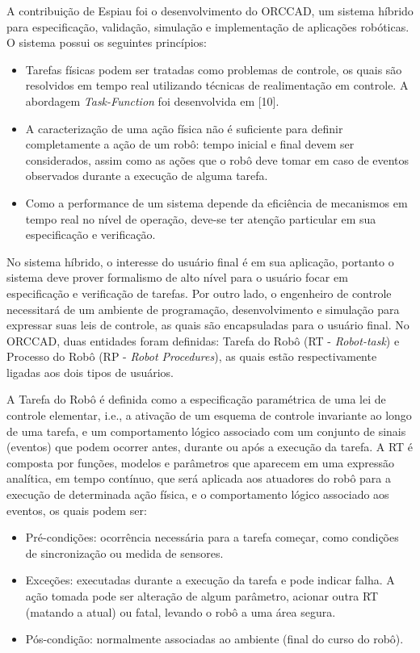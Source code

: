 A contribuição de Espiau foi o desenvolvimento do ORCCAD, um sistema híbrido
para especificação, validação, simulação e implementação de aplicações
robóticas. O sistema possui os seguintes princípios:

\begin{itemize}
  \item Tarefas físicas podem ser tratadas como problemas de controle, os quais
  são resolvidos em tempo real utilizando técnicas de realimentação em controle.
  A abordagem \emph{Task-Function} foi desenvolvida em [10].
  \item A caracterização de uma ação física não é suficiente para definir
  completamente a ação de um robô: tempo inicial e final devem ser considerados,
  assim como as ações que o robô deve tomar em caso de eventos observados
  durante a execução de alguma tarefa.
  \item Como a performance de um sistema depende da eficiência de mecanismos em
  tempo real no nível de operação, deve-se ter atenção particular em sua
  especificação e verificação.
\end{itemize}

No sistema híbrido, o interesse do usuário final é em sua aplicação, portanto
o sistema deve prover formalismo de alto nível para o usuário focar em
especificação e verificação de tarefas. Por outro lado, o engenheiro
de controle necessitará de um ambiente de programação, desenvolvimento e
simulação para expressar suas leis de controle, as quais são encapsuladas para
o usuário final. No ORCCAD, duas entidades foram definidas: Tarefa do Robô (RT
- \emph{Robot-task}) e Processo do Robô (RP - \emph{Robot Procedures}), as
quais estão respectivamente ligadas aos dois tipos de usuários.

A Tarefa do Robô é definida como a especificação paramétrica de uma lei de
controle elementar, i.e., a ativação de um esquema de controle invariante ao
longo de uma tarefa, e um comportamento lógico associado com um conjunto de
sinais (eventos) que podem ocorrer antes, durante ou após a execução da tarefa.
A RT é composta por funções, modelos e parâmetros que aparecem em uma expressão
analítica, em tempo contínuo, que será aplicada aos atuadores do robô para a
execução de determinada ação física, e o comportamento lógico associado aos
eventos, os quais podem ser:

\begin{itemize}
  \item Pré-condições: ocorrência necessária para a tarefa começar, como
  condições de sincronização ou medida de sensores.
  \item Exceções: executadas durante a execução da tarefa e pode indicar falha.
  A ação tomada pode ser alteração de algum parâmetro, acionar outra RT
  (matando a atual) ou fatal, levando o robô a uma área segura.
  \item Pós-condição: normalmente associadas ao ambiente (final do curso do
  robô). 
\end{itemize}

